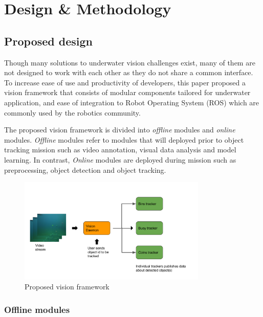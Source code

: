 \documentclass[fypca]{socreport}
\begin{document}

\chapter{Design \& Methodology}

\section{Proposed design}

Though many solutions to underwater vision challenges exist, many of them are
not designed to work with each other as they do not share a common interface. To
increase ease of use and productivity of developers, this paper proposed a
vision framework that consists of modular components tailored for underwater
application, and ease of integration to Robot Operating System (ROS) which are
commonly used by the robotics community.

The proposed vision framework is divided into \textit{offline} modules and
\textit{online} modules. \textit{Offline} modules refer to modules that will
deployed prior to object tracking mission such as video annotation, visual data
analysis and model learning. In contrast, \textit{Online} modules are deployed
during mission such as preprocessing, object detection and object tracking.

\begin{figure}[H]
\centering
  \includegraphics[width=0.8\textwidth, height=0.3\textheight]{framework.png}
  \caption{Proposed vision framework}
  \label{fig:proposed_vision_framework}
\end{figure}

\subsection{Offline modules}
\end{document}
